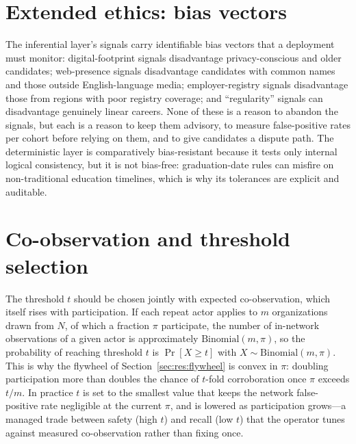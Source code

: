 \documentclass[11pt]{article}
\begin{document}
\section{Extended ethics: bias vectors}\label{app:bias}
The inferential layer's signals carry identifiable bias vectors that a deployment
must monitor: digital-footprint signals disadvantage privacy-conscious and older
candidates; web-presence signals disadvantage candidates with common names and
those outside English-language media; employer-registry signals disadvantage
those from regions with poor registry coverage; and ``regularity'' signals can
disadvantage genuinely linear careers. None of these is a reason to abandon the
signals, but each is a reason to keep them advisory, to measure false-positive
rates per cohort before relying on them, and to give candidates a dispute path.
The deterministic layer is comparatively bias-resistant because it tests only
internal logical consistency, but it is not bias-free: graduation-date rules can
misfire on non-traditional education timelines, which is why its tolerances are
explicit and auditable.

\section{Co-observation and threshold selection}\label{app:coobs}
The threshold $t$ should be chosen jointly with expected co-observation, which
itself rises with participation. If each repeat actor applies to $m$
organizations drawn from $N$, of which a fraction $\pi$ participate, the number of
in-network observations of a given actor is approximately $\mathrm{Binomial}(m,
\pi)$, so the probability of reaching threshold $t$ is $\Pr[X \ge t]$ with $X \sim
\mathrm{Binomial}(m,\pi)$. This is why the flywheel of
Section~\ref{sec:res:flywheel} is convex in $\pi$: doubling participation more than
doubles the chance of $t$-fold corroboration once $\pi$ exceeds $t/m$. In
practice $t$ is set to the smallest value that keeps the network false-positive
rate negligible at the current $\pi$, and is lowered as participation grows---a
managed trade between safety (high $t$) and recall (low $t$) that the operator
tunes against measured co-observation rather than fixing once.
\end{document}
